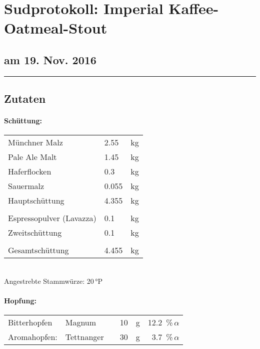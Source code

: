\documentclass[12pt,oneside,a4paper]{scrartcl}
\begin{document}
	\begin{minipage}[c]{0.70\textwidth}
		\section*{\hspace{-.4cm}Sudprotokoll: Imperial Kaffee-Oatmeal-Stout }
	\end{minipage}
	\begin{minipage}[c]{0.29\textwidth}
		\subsection*{am 19. Nov. 2016}
	\end{minipage}
	\rule{\textwidth}{1pt}
%
\subsection*{Zutaten}
%
\paragraph{Schüttung:}
	\begin{tabular}[t]{m{8cm} m{2cm} m{1cm}}
		Münchner Malz & \num{2,55}  & kg \bigstrut\\
		Pale Ale Malt & \num{1,45} & kg \bigstrut\\
		Haferflocken & \num{0,3} & kg \bigstrut\\
		Sauermalz & \num{0,055} & kg \bigstrut\\ \hline
		Hauptschüttung & \num{4,355} & kg \bigstrut\\
		&&\\
		Espressopulver (Lavazza) & \num{0,1} & kg \bigstrut\\\hline
		Zweitschüttung & \num{0,1} & kg \bigstrut\\
		&&\\\hline\hline
		Gesamtschüttung & \num{4,455} & kg\bigstrut
	\end{tabular}\\

\vspace{.25cm}
\hspace{1cm}Angestrebte Stammwürze: 20\,°P
%
\paragraph{Hopfung:}
	\begin{tabular}[t]{l l c r r r}
		Bitterhopfen & Magnum &  & \num{10} &  \si{\gram}& \SI{12,2}{\percent}\,$\alpha$ \\
		Aromahopfen: & Tettnanger &  & \num{30} & \si{\gram} & \SI{3,7}{\percent}\,$\alpha$
	\end{tabular}\\
\end{document}
